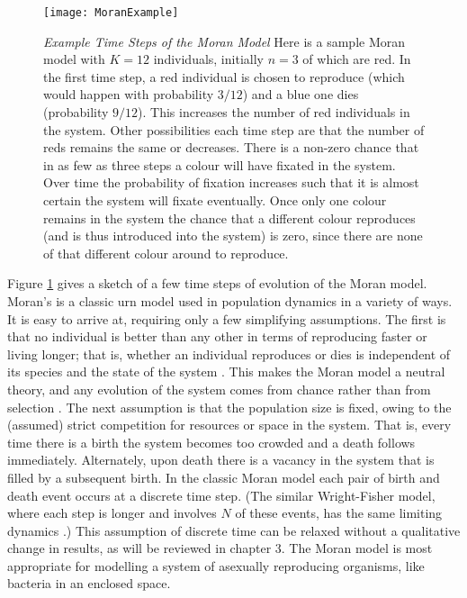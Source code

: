 \begin{figure}[h]
	\centering
	\texttt{[image: MoranExample]}
	\caption{\emph{Example Time Steps of the Moran Model} Here is a sample Moran model with $K=12$ individuals, initially $n=3$ of which are red. In the first time step, a red individual is chosen to reproduce (which would happen with probability $3/12$) and a blue one dies (probability $9/12$). This increases the number of red individuals in the system. Other possibilities each time step are that the number of reds remains the same or decreases. There is a non-zero chance that in as few as three steps a colour will have fixated in the system. Over time the probability of fixation increases such that it is almost certain the system will fixate eventually. Once only one colour remains in the system the chance that a different colour reproduces (and is thus introduced into the system) is zero, since there are none of that different colour around to reproduce. } \label{Moranfig}
\end{figure}

Figure \ref{Moranfig} gives a sketch of a few time steps of evolution of the Moran model. 
Moran's is a classic urn model used in population dynamics in a variety of ways. 
It is easy to arrive at, requiring only a few simplifying assumptions. 
The first is that no individual is better than any other in terms of reproducing faster or living longer; that is, whether an individual reproduces or dies is independent of its species and the state of the system \cite{Moran1962}. %
This makes the Moran model a neutral theory, and any evolution of the system comes from chance rather than from selection \cite{Claussen2005,Blythe2007,Leigh2007,Black2012}. %
The next assumption is that the population size is fixed, owing to the (assumed) strict competition for resources or space in the system. 
That is, every time there is a birth the system becomes too crowded and a death follows immediately. Alternately, upon death there is a vacancy in the system that is filled by a subsequent birth.
In the classic Moran model each pair of birth and death event occurs at a discrete time step. 
(The similar Wright-Fisher model, where each step is longer and involves $N$ of these events, has the same limiting dynamics \cite{Blythe2007}.) 
This assumption of discrete time can be relaxed without a qualitative change in results, as will be reviewed in chapter 3. %
The Moran model is most appropriate for modelling a system of asexually reproducing organisms, like bacteria in an enclosed space. %

